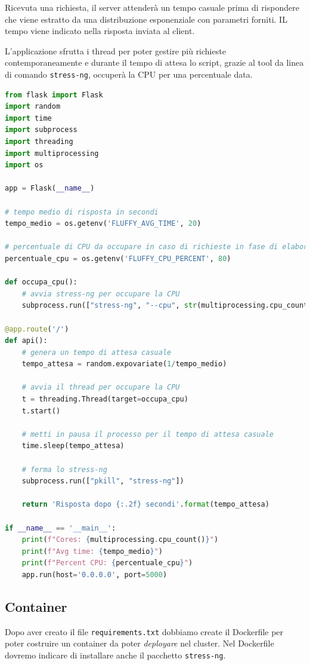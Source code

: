 \documentclass[12pt, hidelinks]{report}
\begin{document}
Ricevuta una richiesta, il server attenderà un tempo casuale prima di rispondere che viene estratto da una distribuzione esponenziale con parametri forniti. IL tempo viene indicato nella risposta inviata al client.

L'applicazione sfrutta i thread per poter gestire più richieste contemporaneamente e durante il tempo di attesa lo script, grazie al tool da linea di comando \texttt{stress-ng}, occuperà la CPU per una percentuale data.

\begin{lstlisting}[language=Python]
from flask import Flask
import random
import time
import subprocess
import threading
import multiprocessing
import os

app = Flask(__name__)

# tempo medio di risposta in secondi
tempo_medio = os.getenv('FLUFFY_AVG_TIME', 20)

# percentuale di CPU da occupare in caso di richieste in fase di elaborazione
percentuale_cpu = os.getenv('FLUFFY_CPU_PERCENT', 80)

def occupa_cpu():
    # avvia stress-ng per occupare la CPU
    subprocess.run(["stress-ng", "--cpu", str(multiprocessing.cpu_count()), "--cpu-load", str(percentuale_cpu)])

@app.route('/')
def api():
    # genera un tempo di attesa casuale
    tempo_attesa = random.expovariate(1/tempo_medio)
    
    # avvia il thread per occupare la CPU
    t = threading.Thread(target=occupa_cpu)
    t.start()

    # metti in pausa il processo per il tempo di attesa casuale
    time.sleep(tempo_attesa)

    # ferma lo stress-ng
    subprocess.run(["pkill", "stress-ng"])

    return 'Risposta dopo {:.2f} secondi'.format(tempo_attesa)

if __name__ == '__main__':
    print(f"Cores: {multiprocessing.cpu_count()}")
    print(f"Avg time: {tempo_medio}")
    print(f"Percent CPU: {percentuale_cpu}")
    app.run(host='0.0.0.0', port=5000)
\end{lstlisting}

\subsection{Container}
Dopo aver creato il file \texttt{requirements.txt} dobbiamo create il Dockerfile per poter costruire un container da poter \textit{deployare} nel cluster. Nel Dockerfile dovremo indicare di installare anche il pacchetto \texttt{stress-ng}.
\end{document}
